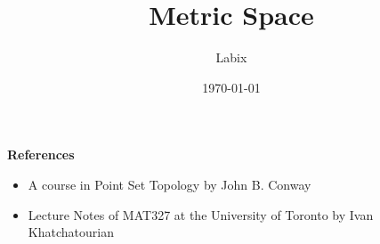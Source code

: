 \documentclass[a4paper]{article}
\title{Metric Space}
\author{Labix}
\date{\today}
\begin{document}
\maketitle
\begin{abstract}
\end{abstract}
\textbf{References}
\begin{itemize}
\item A course in Point Set Topology by John B. Conway
\item Lecture Notes of MAT327 at the University of Toronto by Ivan Khatchatourian
\end{itemize}
\pagebreak
\tableofcontents
\pagebreak

\end{document}
